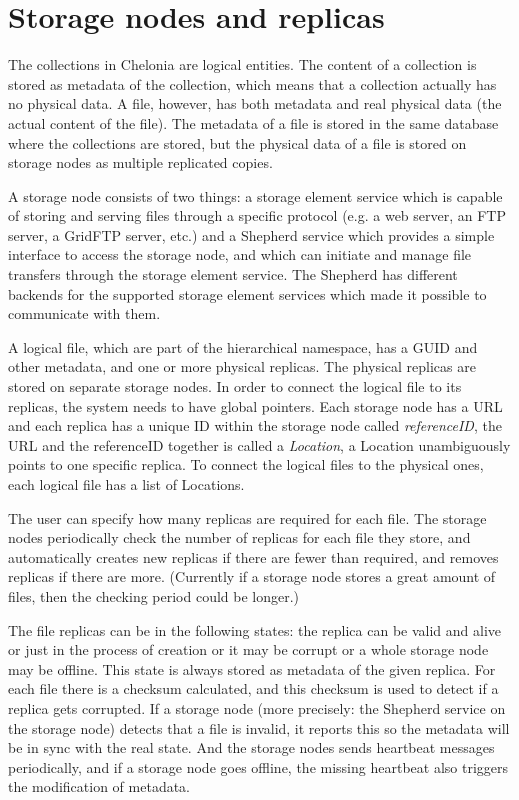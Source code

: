 \documentclass{book}
\begin{document}

\section{Storage nodes and replicas} %
\label{sec:storage_nodes_and_replicas}

The collections in Chelonia are logical entities. The content of a collection is stored as metadata of the collection, which means that a collection actually has no physical data. A file, however, has both metadata and real physical data (the actual content of the file). The metadata of a file is stored in the same database where the collections are stored, but the physical data of a file is stored on storage nodes as multiple replicated copies.

A storage node consists of two things: a storage element service which is capable of storing and serving files through a specific protocol (e.g. a web server, an FTP server, a GridFTP server, etc.) and a Shepherd service which provides a simple interface to access the storage node, and which can initiate and manage file transfers through the storage element service. The Shepherd has different backends for the supported storage element services which made it possible to communicate with them.

A logical file, which are part of the hierarchical namespace, has a GUID and other metadata, and one or more physical replicas. The physical replicas are stored on separate storage nodes. In order to connect the logical file to its replicas, the system needs to have global pointers. Each storage node has a URL and each replica has a unique ID within the storage node called \emph{referenceID}, the URL and the referenceID together is called a \emph{Location}, a Location unambiguously points to one specific replica. To connect the logical files to the physical ones, each logical file has a list of Locations.

The user can specify how many replicas are required for each file. The storage nodes periodically check the number of replicas for each file they store, and automatically creates new replicas if there are fewer than required, and removes replicas if there are more. (Currently if a storage node stores a great amount of files, then the checking period could be longer.)

The file replicas can be in the following states: the replica can be valid and alive or just in the process of creation or it may be corrupt or a whole storage node may be offline. This state is always stored as metadata of the given replica. For each file there is a checksum calculated, and this checksum is used to detect if a replica gets corrupted. If a storage node (more precisely: the Shepherd service on the storage node) detects that a file is invalid, it reports this so the metadata will be in sync with the real state. And the storage nodes sends heartbeat messages periodically, and if a storage node goes offline, the missing heartbeat also triggers the modification of metadata. 
\end{document}
